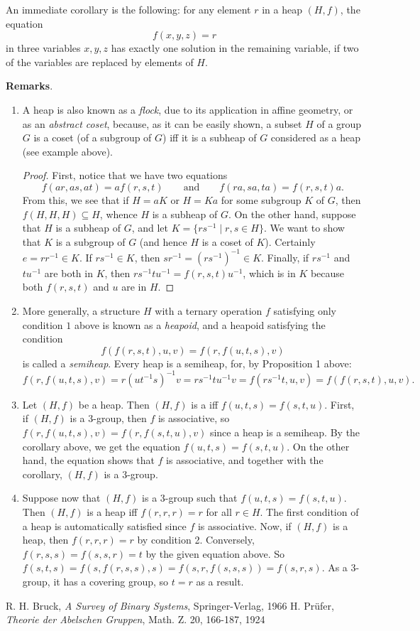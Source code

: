 \documentclass[12pt]{article}
\begin{document}
An immediate corollary is the following: for any element $r$ in a heap $(H,f)$, the equation $$f(x,y,z)=r$$ in three variables $x,y,z$ has exactly one solution in the remaining variable, if two of the variables are replaced by elements of $H$.

\textbf{Remarks}.
\begin{enumerate}
\item
A heap is also known as a \emph{flock}, due to its application in affine geometry, or as an \emph{abstract coset}, because, as it can be easily shown, a subset $H$ of a group $G$ is a coset (of a subgroup of $G$) iff it is a subheap of $G$ considered as a heap (see example above).

\begin{proof}
First, notice that we have two equations $$f(ar,as,at)=af(r,s,t)\qquad\mbox{and}\qquad f(ra,sa,ta)=f(r,s,t)a.$$  From this, we see that if $H=aK$ or $H=Ka$ for some subgroup $K$ of $G$, then $f(H,H,H)\subseteq H$, whence $H$ is a subheap of $G$.  On the other hand, suppose that $H$ is a subheap of $G$, and let $K=\lbrace rs^{-1}\mid r,s\in H\rbrace$.  We want to show that $K$ is a subgroup of $G$ (and hence $H$ is a coset of $K$).  Certainly $e=rr^{-1}\in K$.  If $rs^{-1}\in K$, then $sr^{-1}=(rs^{-1})^{-1}\in K$.  Finally, if $rs^{-1}$ and $tu^{-1}$ are both in $K$, then $rs^{-1}tu^{-1} = f(r,s,t)u^{-1}$, which is in $K$ because both $f(r,s,t)$ and $u$ are in $H$.
\end{proof}
\item
More generally, a structure $H$ with a ternary operation $f$ satisfying only condition $1$ above is known as a \emph{heapoid}, and a heapoid satisfying the condition $$f(f(r,s,t),u,v)=f(r,f(u,t,s),v)$$ is called a \emph{semiheap}.  Every heap is a semiheap, for, by Proposition 1 above: $$f(r,f(u,t,s),v)=r(ut^{-1}s)^{-1}v = rs^{-1}tu^{-1}v = f(rs^{-1}t,u,v)=f(f(r,s,t),u,v).$$
\item
Let $(H,f)$ be a heap.  Then $(H,f)$ is a  iff $f(u,t,s)=f(s,t,u)$.  First, if $(H,f)$ is a $3$-group, then $f$ is associative, so $f(r,f(u,t,s),v)=f(r,f(s,t,u),v)$ since a heap is a semiheap.  By the corollary above, we get the equation $f(u,t,s)=f(s,t,u)$.  On the other hand, the equation shows that $f$ is associative, and together with the corollary, $(H,f)$ is a $3$-group.
\item
Suppose now that $(H,f)$ is a $3$-group such that $f(u,t,s)=f(s,t,u)$.  Then $(H,f)$ is a heap iff $f(r,r,r)=r$ for all $r\in H$.  The first condition of a heap is automatically satisfied since $f$ is associative.  Now, if $(H,f)$ is a heap, then $f(r,r,r)=r$ by condition 2.  Conversely, $f(r,s,s)=f(s,s,r)=t$ by the given equation above.  So $f(s,t,s)=f(s,f(r,s,s),s)=f(s,r,f(s,s,s))=f(s,r,s)$.  As a $3$-group, it has a covering group, so $t=r$ as a result.
\end{enumerate}

\begin{thebibliography}{0}
R. H. Bruck,
{\it A Survey of Binary Systems}, Springer-Verlag, 1966
H. Pr\"{u}fer,
{\it Theorie der Abelschen Gruppen}, Math. Z. 20, 166-187, 1924
\end{thebibliography}
\end{document}
